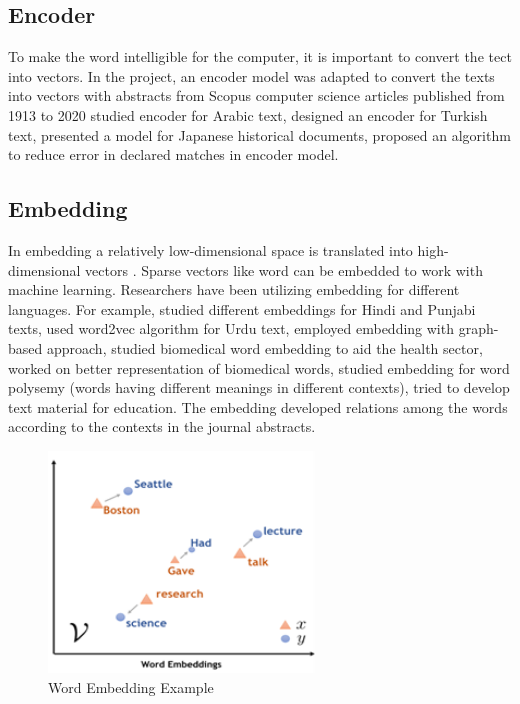 \documentclass[conference]{IEEEtran}
\begin{document}
\subsection{Encoder}
To make the word intelligible for the computer, it is important to convert the tect into vectors. In the project, an encoder model was adapted to convert the texts into vectors with abstracts from Scopus computer science articles published from 1913 to 2020 \cite{b17} studied encoder for Arabic text, \cite{b18} designed an encoder for Turkish text, \cite{b19} presented a model for Japanese historical documents, \cite{b20} proposed an algorithm to reduce error in declared matches in encoder model. 

\subsection{Embedding}
In embedding a relatively low-dimensional space is translated into high-dimensional vectors \cite{b21}. Sparse vectors like word can be embedded to work with machine learning. Researchers have been utilizing embedding for different languages. For example, \cite{b22} studied different embeddings for Hindi and Punjabi texts, \cite{b23} used word2vec algorithm for Urdu text, \cite{b24} employed embedding with graph-based approach, \cite{b25} studied biomedical word embedding to aid the health sector, \cite{b26} worked on better representation of biomedical words, \cite{b27} studied embedding for word polysemy (words having different meanings in different contexts), \cite{b28} tried to develop text material for education. The embedding developed relations among the words according to the contexts in the journal abstracts.

\begin{figure}[htbp]
\centerline{\includegraphics[width=200pt]{images/embed.png}}
\caption{Word Embedding Example\cite{b29}}
\label{Embed}
\end{figure}
\end{document}

